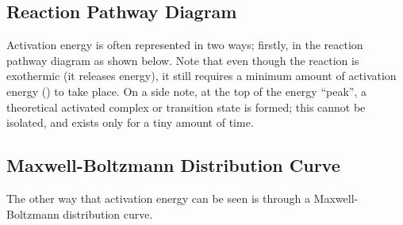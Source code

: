 		\pagebreak
		\subsection{Reaction Pathway Diagram}

			Activation energy is often represented in two ways; firstly, in the reaction pathway diagram as shown below. Note that even though
			the reaction is exothermic (it releases energy), it still requires a minimum amount of activation energy (\ea) to take place. On a side
			note, at the top of the energy \enquote{peak}, a theoretical activated complex or transition state is formed; this cannot be isolated, and
			exists only for a tiny amount of time.





		\subsection{Maxwell-Boltzmann Distribution Curve}

			The other way that activation energy can be seen is through a Maxwell-Boltzmann distribution curve.

